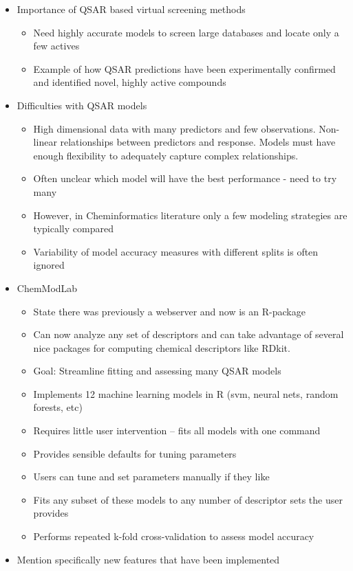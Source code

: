 \begin{itemize}
\tightlist
\item
  Importance of QSAR based virtual screening methods

  \begin{itemize}
  \tightlist
  \item
    Need highly accurate models to screen large databases and locate
    only a few actives
  \item
    Example of how QSAR predictions have been experimentally confirmed
    and identified novel, highly active compounds
  \end{itemize}
\item
  Difficulties with QSAR models

  \begin{itemize}
  \tightlist
  \item
    High dimensional data with many predictors and few observations.
    Non-linear relationships between predictors and response. Models
    must have enough flexibility to adequately capture complex
    relationships.
  \item
    Often unclear which model will have the best performance - need to
    try many
  \item
    However, in Cheminformatics literature only a few modeling
    strategies are typically compared
  \item
    Variability of model accuracy measures with different splits is
    often ignored
  \end{itemize}
\item
  ChemModLab

  \begin{itemize}
  \tightlist
  \item
    State there was previously a webserver and now is an R-package
  \item
    Can now analyze any set of descriptors and can take advantage of
    several nice packages for computing chemical descriptors like RDkit.
  \item
    Goal: Streamline fitting and assessing many QSAR models
  \item
    Implements 12 machine learning models in R (svm, neural nets, random
    forests, etc)
  \item
    Requires little user intervention -- fits all models with one
    command
  \item
    Provides sensible defaults for tuning parameters
  \item
    Users can tune and set parameters manually if they like
  \item
    Fits any subset of these models to any number of descriptor sets the
    user provides
  \item
    Performs repeated k-fold cross-validation to assess model accuracy
  \end{itemize}
\item
  Mention specifically new features that have been implemented


\end{itemize}
